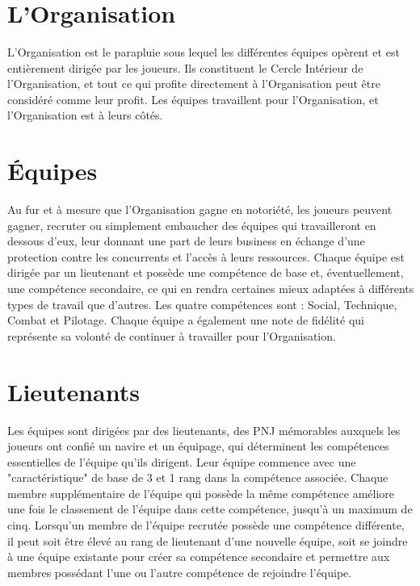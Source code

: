 \documentclass{article}
\begin{document}
\title{\vspace{-0.5cm}{\Huge L'Organisation -- Fonder son propre syndicat criminel} \vspace{-1cm}}

\date{}

\maketitle

\section*{L'Organisation}
L'Organisation est le parapluie sous lequel les différentes équipes opèrent et est entièrement dirigée par les joueurs. Ils constituent le Cercle Intérieur de l'Organisation, et tout ce qui profite directement à l'Organisation peut être considéré comme leur profit. Les équipes travaillent pour l'Organisation, et l'Organisation est à leurs côtés.

\section*{Équipes}
Au fur et à mesure que l'Organisation gagne en notoriété, les joueurs peuvent gagner, recruter ou simplement embaucher des équipes qui travailleront en dessous d'eux, leur donnant une part de leurs business en échange d'une protection contre les concurrents et l'accès à leurs ressources. Chaque équipe est dirigée par un lieutenant et possède une compétence de base et, éventuellement, une compétence secondaire, ce qui en rendra certaines mieux adaptées à différents types de travail que d'autres. Les quatre compétences sont : Social, Technique, Combat et Pilotage. Chaque équipe a également une note de fidélité qui représente sa volonté de continuer à travailler pour l'Organisation.

\section*{Lieutenants}
Les équipes sont dirigées par des lieutenants, des PNJ mémorables auxquels les joueurs ont confié un navire et un équipage, qui déterminent les compétences essentielles de l'équipe qu'ils dirigent.  Leur équipe commence avec une "caractéristique" de base de 3 et 1 rang dans la compétence associée. Chaque membre supplémentaire de l'équipe qui possède la même compétence améliore une fois le classement de l'équipe dans cette compétence, jusqu'à un maximum de cinq. Lorsqu'un membre de l'équipe recrutée possède une compétence différente, il peut soit être élevé au rang de lieutenant d'une nouvelle équipe, soit se joindre à une équipe existante pour créer sa compétence secondaire et permettre aux membres possédant l'une ou l'autre compétence de rejoindre l'équipe.\\
\end{document}
